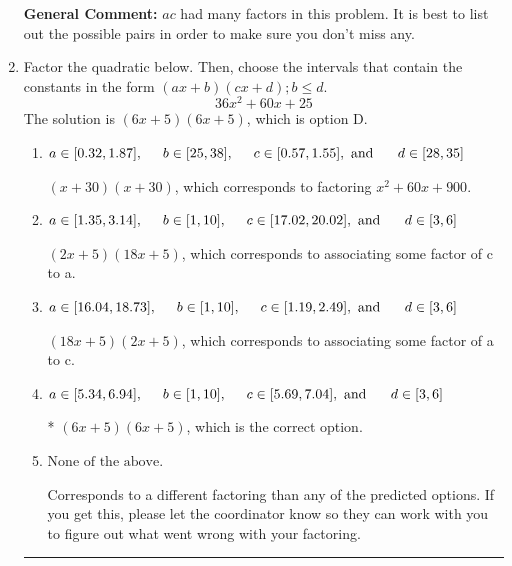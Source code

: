\documentclass{extbook}[14pt]
\newcommand{\litem}[1]{\item #1

\rule{\textwidth}{0.4pt}}
\begin{document}
\begin{enumerate}
{\textbf{General Comment:} $ac$ had many factors in this problem. It is best to list out the possible pairs in order to make sure you don't miss any.
}
\litem{
Factor the quadratic below. Then, choose the intervals that contain the constants in the form $(ax+b)(cx+d); b \leq d.$
\[ 36x^{2} +60 x + 25 \]The solution is \( (6x + 5)(6x + 5) \), which is option D.\begin{enumerate}[label=\Alph*.]
\item \( a \in [0.32, 1.87], \hspace*{5mm} b \in [25, 38], \hspace*{5mm} c \in [0.57, 1.55], \text{ and } \hspace*{5mm} d \in [28, 35] \)

 $(x + 30)(x + 30)$, which corresponds to factoring $x^{2} +60 x + 900$.
\item \( a \in [1.35, 3.14], \hspace*{5mm} b \in [1, 10], \hspace*{5mm} c \in [17.02, 20.02], \text{ and } \hspace*{5mm} d \in [3, 6] \)

 $(2x + 5)(18x + 5)$, which corresponds to associating some factor of c to a.
\item \( a \in [16.04, 18.73], \hspace*{5mm} b \in [1, 10], \hspace*{5mm} c \in [1.19, 2.49], \text{ and } \hspace*{5mm} d \in [3, 6] \)

 $(18x + 5)(2x + 5)$, which corresponds to associating some factor of a to c.
\item \( a \in [5.34, 6.94], \hspace*{5mm} b \in [1, 10], \hspace*{5mm} c \in [5.69, 7.04], \text{ and } \hspace*{5mm} d \in [3, 6] \)

* $(6x + 5)(6x + 5)$, which is the correct option.
\item \( \text{None of the above.} \)

 Corresponds to a different factoring than any of the predicted options. If you get this, please let the coordinator know so they can work with you to figure out what went wrong with your factoring.
\end{enumerate}

}
\end{enumerate}
\end{document}

